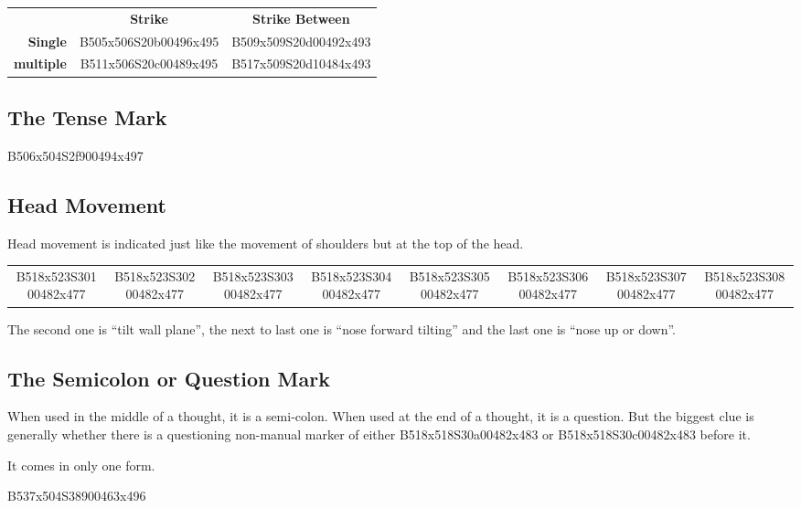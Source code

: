 \documentclass{article}
\begin{document}
\begin{center}
\begin{tabular}{r*{2}{c}}
&\textbf{Strike}&\textbf{Strike Between}\\
\textbf{Single}  &B505x506S20b00496x495&B509x509S20d00492x493\\
\textbf{multiple}&B511x506S20c00489x495&B517x509S20d10484x493\\
\end{tabular}
\end{center}

\subsection{The Tense Mark}

\begin{center}
B506x504S2f900494x497
\end{center}

\subsection{Head Movement}

Head movement is indicated just like the movement of shoulders but at the top of the head.

\begin{center}
\begin{tabular}{*{8}{c}}
B518x523S30100482x477&
B518x523S30200482x477&
B518x523S30300482x477&
B518x523S30400482x477&
B518x523S30500482x477&
B518x523S30600482x477&
B518x523S30700482x477&
B518x523S30800482x477\\
\end{tabular}
\end{center}

The second one is ``tilt wall plane'', the next to last one is ``nose forward tilting'' and the last one is ``nose up or down''.

\subsection{The Semicolon or Question Mark}

When used in the middle of a thought, it is a semi-colon.
When used at the end of a thought, it is a question.
But the biggest clue is generally whether there is a questioning non-manual marker of either B518x518S30a00482x483 or B518x518S30c00482x483 before it.

It comes in only one form.

\begin{center}
B537x504S38900463x496\\
\end{center}
\end{document}
